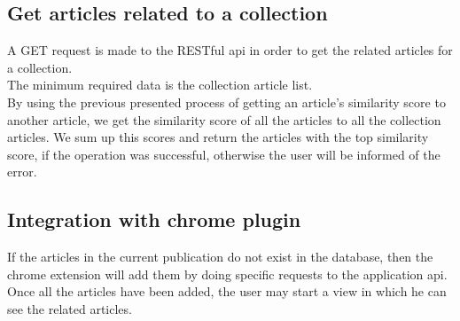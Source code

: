 \subsection{Get articles related to a collection}
\label{sec:workflow-get-articles-related-to-collection}
A GET request is made to the RESTful api in order to get the related articles for  a collection.
\\ The minimum required data is the collection article list.
\\ By using the previous presented process of getting an article’s similarity score to another article, we get the similarity score of all the articles to all the collection articles. We sum up this scores and return the articles with the top similarity score, if the operation was successful, otherwise the user will be informed of the error.

\subsection{Integration with chrome plugin}
\label{sec:workflow-integration-with-chrome-plugin}
If the articles in the current publication do not exist in the database, then the chrome extension will add them by doing specific requests to the application api.
\\ Once all the articles have been added, the user may start a view in which he can see the related articles.